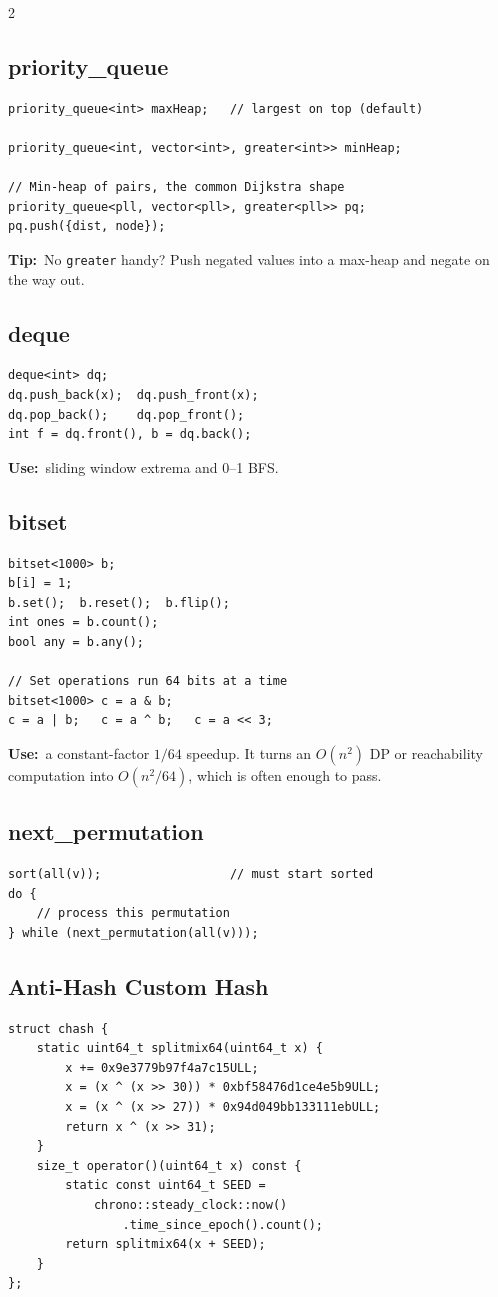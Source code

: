 \documentclass[10pt]{article}
\newcommand{\code}[1]{\texttt{\small #1}}
\newcommand{\uses}[1]{{\color{accent2}\footnotesize\textbf{Use:}}~{\footnotesize #1}\par}
\newcommand{\tip}[1]{{\color{tipc}\footnotesize\textbf{Tip:}}~{\footnotesize #1}\par}
\begin{document}
\begin{multicols}{2}
\subsection{priority\_queue}
\begin{lstlisting}
priority_queue<int> maxHeap;   // largest on top (default)

priority_queue<int, vector<int>, greater<int>> minHeap;

// Min-heap of pairs, the common Dijkstra shape
priority_queue<pll, vector<pll>, greater<pll>> pq;
pq.push({dist, node});
\end{lstlisting}
\tip{No \code{greater} handy? Push negated values into a max-heap and
negate on the way out.}

\subsection{deque}
\begin{lstlisting}
deque<int> dq;
dq.push_back(x);  dq.push_front(x);
dq.pop_back();    dq.pop_front();
int f = dq.front(), b = dq.back();
\end{lstlisting}
\uses{sliding window extrema and 0--1 BFS.}

\subsection{bitset}
\begin{lstlisting}
bitset<1000> b;
b[i] = 1;
b.set();  b.reset();  b.flip();
int ones = b.count();
bool any = b.any();

// Set operations run 64 bits at a time
bitset<1000> c = a & b;
c = a | b;   c = a ^ b;   c = a << 3;
\end{lstlisting}
\uses{a constant-factor $1/64$ speedup. It turns an $O(n^2)$ DP or
reachability computation into $O(n^2/64)$, which is often enough to
pass.}

\subsection{next\_permutation}
\begin{lstlisting}
sort(all(v));                  // must start sorted
do {
    // process this permutation
} while (next_permutation(all(v)));
\end{lstlisting}

\subsection{Anti-Hash Custom Hash}
\begin{lstlisting}
struct chash {
    static uint64_t splitmix64(uint64_t x) {
        x += 0x9e3779b97f4a7c15ULL;
        x = (x ^ (x >> 30)) * 0xbf58476d1ce4e5b9ULL;
        x = (x ^ (x >> 27)) * 0x94d049bb133111ebULL;
        return x ^ (x >> 31);
    }
    size_t operator()(uint64_t x) const {
        static const uint64_t SEED =
            chrono::steady_clock::now()
                .time_since_epoch().count();
        return splitmix64(x + SEED);
    }
};


\end{lstlisting}
\end{multicols}
\end{document}
